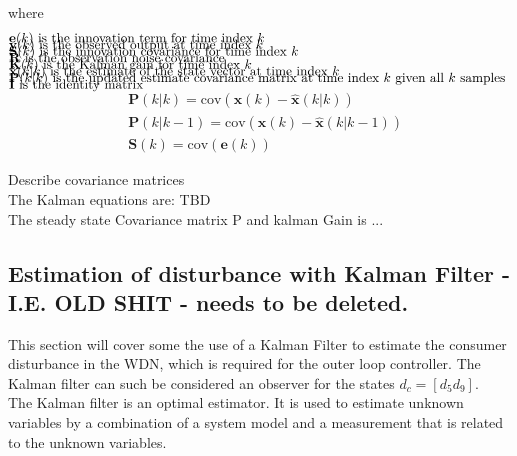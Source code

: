 where 
\begin{align*}
	&\text{$\textbf{e}(k)$ is the innovation term for time index $ k $															}	\\[-1em]
	&\text{$\textbf{y}(k)$ is the observed output at time index $ k $															}	\\[-1em]
	&\text{$\textbf{S}(k)$ is the innovation covariance for time index $ k $													}	\\[-1em]
	&\text{$\textbf{R}$ is the observation noise covariance																		}	\\[-1em]
	&\text{$\textbf{K}(k)$ is the Kalman gain for time index $ k $																}	\\[-1em]
	&\text{$\hat{\textbf{x}}(k|k)$ is the estimate of the state vector at time index $ k $										}	\\[-1em]
	&\text{$\textbf{P}(k|k)$ is the updated estimate covariance matrix at time index $k$ given all $ k$ samples					}	\\[-1em]
	&\text{$\textbf{I}$ is the identity matrix																					}	\\[-1em]			
\end{align*}
\begin{align}
	&\textbf{P}(k|k) = \text{cov}(\textbf{x}(k)-\hat{\textbf{x}}(k|k))			\\
	&\textbf{P}(k|k-1) = \text{cov}(\textbf{x}(k)-\hat{\textbf{x}}(k|k-1)) 	\\
	&\textbf{S}(k) = \text{cov}(\textbf{e}(k)) 
\end{align}



Describe covariance matrices\\


The Kalman equations are: TBD \\

The steady state Covariance matrix P and kalman Gain is ...




\clearpage \newpage
\subsection{Estimation of disturbance with Kalman Filter - I.E. OLD SHIT - needs to be deleted.}
This section will cover some the use of a Kalman Filter to estimate the consumer disturbance in the WDN, which is required for the outer loop controller. The Kalman filter can such be considered an observer for the states $d_c = [d_5 d_9]$. \\
The Kalman filter is an optimal estimator. It is used to estimate unknown variables by a combination of a system model and a measurement that is related to the unknown variables. 

